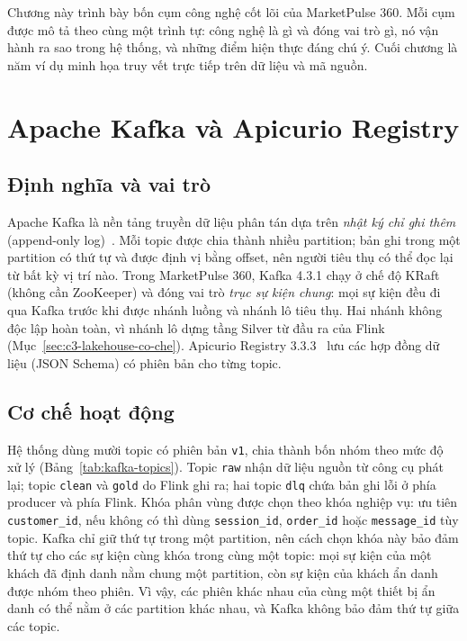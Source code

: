 
Chương này trình bày bốn cụm công nghệ cốt lõi của MarketPulse 360. Mỗi cụm được mô tả theo cùng một trình tự: công nghệ là gì và đóng vai trò gì, nó vận hành ra sao trong hệ thống, và những điểm hiện thực đáng chú ý. Cuối chương là năm ví dụ minh họa truy vết trực tiếp trên dữ liệu và mã nguồn.

\section{Apache Kafka và Apicurio Registry}
\label{sec:c3-kafka}

\subsection{Định nghĩa và vai trò}
\label{sec:c3-kafka-dinh-nghia}
Apache Kafka là nền tảng truyền dữ liệu phân tán dựa trên \emph{nhật ký chỉ ghi thêm} (append-only log)~\cite{kreps2011kafka, kafkadocs}. Mỗi topic được chia thành nhiều partition; bản ghi trong một partition có thứ tự và được định vị bằng offset, nên người tiêu thụ có thể đọc lại từ bất kỳ vị trí nào. Trong MarketPulse 360, Kafka 4.3.1 chạy ở chế độ KRaft (không cần ZooKeeper) và đóng vai trò \emph{trục sự kiện chung}: mọi sự kiện đều đi qua Kafka trước khi được nhánh luồng và nhánh lô tiêu thụ. Hai nhánh không độc lập hoàn toàn, vì nhánh lô dựng tầng Silver từ đầu ra của Flink (Mục~\ref{sec:c3-lakehouse-co-che}). Apicurio Registry 3.3.3~\cite{apicurio} lưu các hợp đồng dữ liệu (JSON Schema) có phiên bản cho từng topic.

\subsection{Cơ chế hoạt động}
\label{sec:c3-kafka-co-che}
Hệ thống dùng mười topic có phiên bản \texttt{v1}, chia thành bốn nhóm theo mức độ xử lý (Bảng~\ref{tab:kafka-topics}). Topic \texttt{raw} nhận dữ liệu nguồn từ công cụ phát lại; topic \texttt{clean} và \texttt{gold} do Flink ghi ra; hai topic \texttt{dlq} chứa bản ghi lỗi ở phía producer và phía Flink. Khóa phân vùng được chọn theo khóa nghiệp vụ: ưu tiên \texttt{customer\_id}, nếu không có thì dùng \texttt{session\_id}, \texttt{order\_id} hoặc \texttt{message\_id} tùy topic. Kafka chỉ giữ thứ tự trong một partition, nên cách chọn khóa này bảo đảm thứ tự cho các sự kiện cùng khóa trong cùng một topic: mọi sự kiện của một khách đã định danh nằm chung một partition, còn sự kiện của khách ẩn danh được nhóm theo phiên. Vì vậy, các phiên khác nhau của cùng một thiết bị ẩn danh có thể nằm ở các partition khác nhau, và Kafka không bảo đảm thứ tự giữa các topic.

